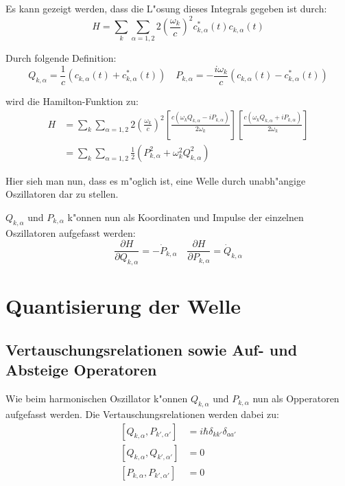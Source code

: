 Es kann gezeigt werden, dass die L"osung dieses Integrals gegeben ist durch:
\begin{equation}
H = \sum_k \sum_{\alpha=1,2} 2 \left(\frac{\omega_k}{c}\right)^2 c^*_{k,\alpha}(t) c_{k,\alpha}(t)
\end{equation}

Durch folgende Definition:
\begin{equation}
Q_{k,\alpha} = \frac{1}{c}(c_{k,\alpha}(t) + c^*_{k,\alpha}(t)) \quad P_{k,\alpha} = -\frac{i\omega_k}{c}(c_{k,\alpha}(t) - c^*_{k,\alpha}(t)) 
\end{equation}

wird die Hamilton-Funktion zu:
\begin{equation} \label{fq:hamilton}
\begin{split}
H &= \sum_k \sum_{\alpha=1,2} 2 \left(\frac{\omega_k}{c}\right)^2 \left[ \frac{c(\omega_k Q_{k,\alpha} - i P_{k,\alpha})}{2 \omega_k} \right] \left[ \frac{c(\omega_k Q_{k,\alpha} + i P_{k,\alpha})}{2 \omega_k} \right] \\
&= \sum_k \sum_{\alpha=1,2} \frac{1}{2} (P_{k,\alpha}^2 + \omega_k^2 Q_{k,\alpha}^2)
\end{split}
\end{equation}

Hier sieh man nun, dass es m"oglich ist, eine Welle durch unabh"angige Oszillatoren dar zu stellen.

$Q_{k,\alpha}$ und $P_{k,\alpha}$ k"onnen nun als Koordinaten und Impulse der einzelnen Oszillatoren aufgefasst werden:
\begin{equation}
\dfrac{\partial H}{\partial Q_{k,\alpha}} = -\dot{P}_{k,\alpha} \quad \dfrac{\partial H}{\partial P_{k,\alpha}} = \dot{Q}_{k,\alpha}
\end{equation}

\section{Quantisierung der Welle}

\subsection{Vertauschungsrelationen sowie Auf- und Absteige Operatoren}
Wie beim harmonischen Oszillator k"onnen $Q_{k,\alpha}$ und $P_{k,\alpha}$ nun als Opperatoren aufgefasst werden. Die Vertauschungsrelationen werden dabei zu:
\begin{equation}
\begin{split}
[Q_{k,\alpha}, P_{k',\alpha'}] &= i \hbar \delta_{kk'}\delta_{aa'} \\
[Q_{k,\alpha}, Q_{k',\alpha'}] &= 0 \\
[P_{k,\alpha}, P_{k',\alpha'}] &= 0
\end{split}
\end{equation}

